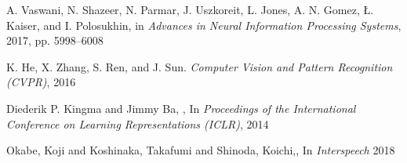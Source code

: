 \documentclass{article}
\begin{document}
\begin{thebibliography}{30}
\bibitem{}
A. Vaswani, N. Shazeer, N. Parmar, J. Uszkoreit, L. Jones, A. N.
Gomez, Ł. Kaiser, and I. Polosukhin, 
in \textit{Advances in Neural Information Processing Systems}, 2017, pp.
5998–6008

\bibitem{}
K. He, X. Zhang, S. Ren, and J. Sun.  \textit{Computer Vision and Pattern Recognition
(CVPR)}, 2016

\bibitem{}
Diederik P. Kingma and Jimmy Ba, , In \textit{Proceedings of the International Conference on Learning Representations (ICLR)}, 2014

\bibitem{}
Okabe, Koji and Koshinaka, Takafumi and Shinoda, Koichi,, In \textit{Interspeech} 2018


\end{thebibliography}
\end{document}
